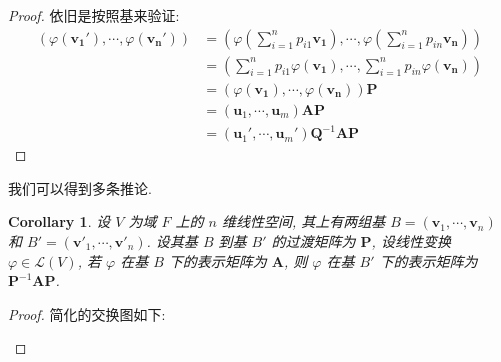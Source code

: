 \documentclass[UTF8]{book}
\newtheorem{corollary}{Corollary}[section]
\begin{document}
\begin{proof}
    依旧是按照基来验证: 
    $$\begin{aligned}
        \left( \varphi\left( \boldsymbol{v_1'} \right),
        \cdots ,\varphi\left( \boldsymbol{v_n'} \right)
        \right) 
        &= \left( \varphi\left( \sum\limits_{i=1}^{n}
        p_{i1}\boldsymbol{v_1} \right),
        \cdots ,\varphi\left( \sum\limits_{i=1}^{n}
        p_{in}\boldsymbol{v_n} \right) 
        \right) \\
        &= \left( \sum\limits_{i=1}^{n}
        p_{i1}\varphi\left( \boldsymbol{v_1} \right),
        \cdots ,\sum\limits_{i=1}^{n}
        p_{in}\varphi\left( \boldsymbol{v_n} \right) 
        \right) \\
        &= (\varphi\left( \boldsymbol{v_1} \right),
        \cdots ,\varphi\left( \boldsymbol{v_n} \right) )
        \boldsymbol{P}\\
        &=(\boldsymbol{u}_1,\cdots,\boldsymbol{u}_m)
        \boldsymbol{A}\boldsymbol{P}\\
        &=(\boldsymbol{u}_1',\cdots,\boldsymbol{u}_m')
        \boldsymbol{Q}^{-1}\boldsymbol{A}\boldsymbol{P}
    \end{aligned}$$
\end{proof}

我们可以得到多条推论. 

\begin{corollary}
    设 $V$ 为域 $F$ 上的 $n$ 维线性空间, 其上有两组基 
    $B=(\boldsymbol{v}_1,\cdots,\boldsymbol{v}_n)$ 
    和 $B'=(\boldsymbol{v}'_1,\cdots,\boldsymbol{v}'_n)$. 
    设其基 $B$ 到基 $B'$ 的过渡矩阵为 $\boldsymbol{P}$, 
    设线性变换 $\varphi \in \mathcal{L}(V)$, 
    若 $\varphi$ 在基 $B$ 下的表示矩阵为 $\boldsymbol{A}$, 
    则 $\varphi$ 在基 $B'$ 下的表示矩阵为 
    $\boldsymbol{P}^{-1}\boldsymbol{A}\boldsymbol{P}$. 
\end{corollary}

\begin{proof}
    简化的交换图如下: 
    \begin{center}
    \end{center}
\end{proof}
\end{document}
